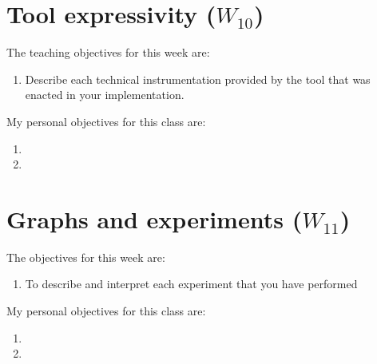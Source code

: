\documentclass[a4paper,12pt]{report}
\begin{document}
\vspace{0.5cm}

\vspace{0.5cm}




\chapter{Tool expressivity ($W_{10}$)}


The teaching objectives for this week are:
\begin{enumerate}
 \item Describe each technical instrumentation provided 
by the tool that was enacted in your implementation.
\end{enumerate}

\vspace{0.5cm}

My personal objectives for this class are:
\begin{enumerate}
 \item 
 \item 
\end{enumerate}





\chapter{Graphs and experiments ($W_{11}$)}

The objectives for this week are:
\begin{enumerate}
 \item To describe and interpret each experiment that you have performed
\end{enumerate}

\vspace{0.5cm}

My personal objectives for this class are:
\begin{enumerate}
 \item 
 \item 
\end{enumerate}
\end{document}
